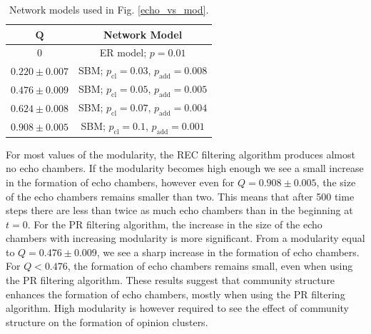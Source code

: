 \documentclass[11 pt , letterpaper , twoside , openright]{book}
\begin{document}
\begin{table}[H]
\centering
\setlength{\tabcolsep}{10pt} %
\renewcommand{\arraystretch}{1.5} %
\begin{tabular}{c | c}
$\bm{Q}$ & \textbf{Network Model} \\
\hline
$0$ & ER model; $p=0.01$ \\
$0.220 \pm 0.007$ & SBM; $p_{\text{cl}} = 0.03$, $p_{\text{add}} = 0.008$ \\
$0.476 \pm 0.009$ & SBM; $p_{\text{cl}} = 0.05$, $p_{\text{add}} = 0.005$ \\
$0.624 \pm 0.008$ & SBM; $p_{\text{cl}} = 0.07$, $p_{\text{add}} = 0.004$ \\
$0.908 \pm 0.005$ & SBM; $p_{\text{cl}} = 0.1$, $p_{\text{add}} = 0.001$ \\
\end{tabular}
\caption{Network models used in Fig. \ref{echo_vs_mod}.}
\label{tab1}
\end{table}
\noindent
For most values of the modularity, the REC filtering algorithm produces almost no echo chambers. If the modularity becomes high enough we see a small increase in the formation of echo chambers, however even for $Q = 0.908 \pm 0.005$, the size of the echo chambers remains smaller than two. This means that after 500 time steps there are less than twice as much echo chambers than in the beginning at $t=0$. For the PR filtering algorithm, the increase in the size of the echo chambers with increasing modularity is more significant. From a modularity equal to $Q = 0.476 \pm 0.009$, we see a sharp increase in the formation of echo chambers. For $Q < 0.476$, the formation of echo chambers remains small, even when using the PR filtering algorithm. These results suggest that community structure enhances the formation of echo chambers, mostly when using the PR filtering algorithm. High modularity is however required to see the effect of community structure on the formation of opinion clusters.
\newpage
\end{document}
